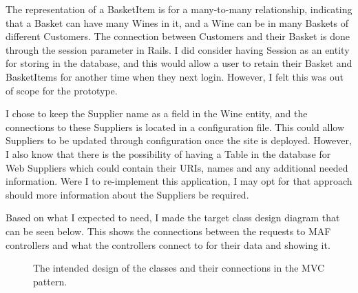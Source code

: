 \documentclass[12pt]{article}
\begin{document}
The representation of a BasketItem is for a many-to-many relationship, indicating that a Basket can have many Wines in it, and a Wine can be in many Baskets of different Customers. The connection between Customers and their Basket is done through the session parameter in Rails. I did consider having Session as an entity for storing in the database, and this would allow a user to retain their Basket and BasketItems for another time when they next login. However, I felt this was out of scope for the prototype.

I chose to keep the Supplier name as a field in the Wine entity, and the connections to these Suppliers is located in a configuration file. This could allow Suppliers to be updated through configuration once the site is deployed. However, I also know that there is the possibility of having a Table in the database for Web Suppliers which could contain their URIs, names and any additional needed information. Were I to re-implement this application, I may opt for that approach should more information about the Suppliers be required.

Based on what I expected to need, I made the target class design diagram that can be seen below. This shows the connections between the requests to MAF controllers and what the controllers connect to for their data and showing it.

\vspace*{\fill}
\begin{figure}[H]
        \centering
\noindent{}%
                \caption{The intended design of the classes and their connections in the MVC pattern.}
                \label{fig: Target Class Diagram.} 
\end{figure}
\end{document}
